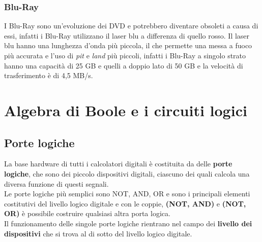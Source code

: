 \documentclass[12pt]{report}
\begin{document}
\subsection{Blu-Ray}
I Blu-Ray sono un'evoluzione dei DVD e potrebbero diventare obsoleti a causa di essi, infatti i Blu-Ray utilizzano il laser blu a differenza di quello rosso. Il laser blu hanno una lunghezza d'onda più piccola, il che permette una messa a fuoco più accurata e l'uso di \textit{pit} e \textit{land} più piccoli, infatti i Blu-Ray a singolo strato hanno una capacità di 25 GB e quelli a doppio lato di 50 GB e la velocità di trasferimento è di 4,5 MB/s.
\chapter{Algebra di Boole e i circuiti logici}
		\section{Porte logiche}
			La base hardware di tutti i calcolatori digitali è costituita da delle \textbf{porte logiche}, che sono dei piccolo dispositivi digitali, ciascuno dei quali calcola una diversa funzione di questi segnali. \\
			Le porte logiche più semplici sono NOT, AND, OR e sono i principali elementi costitutivi del livello logico digitale e con le coppie, \textbf{(NOT, AND)} e \textbf{(NOT, OR)}  è possibile costruire qualsiasi altra porta logica. \\
			Il funzionamento delle singole porte logiche rientrano nel campo dei \textbf{livello dei dispositivi} che si trova al di sotto del livello logico digitale.
\end{document}
